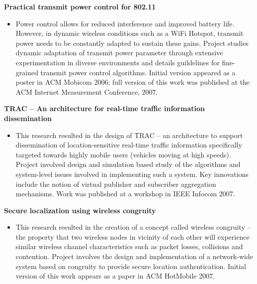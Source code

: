 \begin{resume}
{\bf Practical transmit power control for 802.11}

\begin{itemize}
\item [] Power control allows for reduced interference and improved battery life.
However, in dynamic wireless conditions such as a WiFi Hotspot, transmit power
needs to be constantly adapted to sustain these gains. Project studies dynamic
adaptation of transmit power parameter through extensive experimentation in
diverse environments and details guildelines for fine-grained transmit power
control algorithms. Initial version appeared as a poster in ACM Mobicom 2006;
full version of this work was published at the ACM Internet Measurement
Conference, 2007.
\end{itemize} \vspace{-0.2cm}

{\bf TRAC -- An architecture for real-time traffic information dissemination}
    \begin{itemize}
	\item [] This research resulted in the design of TRAC -- an architecture to support dissemination of location-sensitive real-time traffic information
specifically targeted towards highly mobile users (vehicles moving at high speeds). Project involved design and
simulation based study of the algorithms and system-level issues involved in implementing such a system. Key innovations
include the notion of virtual publisher and subscriber aggregation mechanisms.
Work was published at a workshop in IEEE Infocom 2007.
    \end{itemize}

\vspace{-0.2cm}

{\bf Secure localization using wireless congruity}
    \begin{itemize}
	\item [] This research resulted in the creation of a concept called
	wireless congruity -- the property that two wireless nodes in vicinity of each other will
experience similar wireless channel characteristics such as packet losses, collisions and contention. Project involves the design
and implementation of a network-wide system based on congruity to provide secure location authentication. Initial
version of this work appears as a paper in ACM HotMobile 2007.
    \end{itemize}
\vspace{-0.2cm}


\end{resume}
